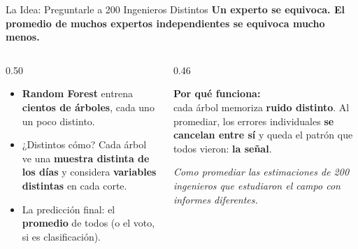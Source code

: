 \documentclass[aspectratio=169, 11pt]{beamer}
\begin{document}
\begin{frame}{La Idea: Preguntarle a 200 Ingenieros Distintos}
  \vspace{-6pt}
  {\small\color{arcaDark}\bfseries
    Un experto se equivoca. El \textbf{promedio de muchos expertos independientes} se equivoca mucho menos.}

  \vspace{8pt}
  \begin{columns}[T]
    \begin{column}{0.50\textwidth}
      {\footnotesize\color{textMuted}
      \begin{itemize}\setlength{\itemsep}{7pt}
        \item[{\color{arcaRed}\scriptsize\faTree}]
          \textbf{Random Forest} entrena \textbf{cientos de árboles},
          cada uno un poco distinto.
        \item[{\color{arcaRed}\scriptsize\faRandom}]
          ¿Distintos cómo? Cada árbol ve una \textbf{muestra
          distinta de los días} y considera \textbf{variables
          distintas} en cada corte.
        \item[{\color{arcaRed}\scriptsize\faUsers}]
          La predicción final: el \textbf{promedio} de todos
          (o el voto, si es clasificación).
      \end{itemize}
      }
    \end{column}
    \begin{column}{0.46\textwidth}
      \begin{tcolorbox}[colback=arcaGray, colframe=codeGreen, boxrule=0pt, leftrule=3pt,
        arc=3pt, left=6pt, right=6pt, top=5pt, bottom=5pt]
        {\scriptsize\color{arcaDark}\bfseries Por qué funciona:}\\[4pt]
        {\scriptsize\color{textMuted}
          cada árbol memoriza \textbf{ruido distinto}. Al
          promediar, los errores individuales
          \textbf{se cancelan entre sí} y queda el patrón
          que todos vieron: \textbf{la señal}.}
      \end{tcolorbox}
      \vspace{5pt}
      {\scriptsize\color{textMuted}\itshape
        Como promediar las estimaciones de 200
        ingenieros que estudiaron el campo
        con informes diferentes.}
    \end{column}
  \end{columns}
\end{frame}
\end{document}

